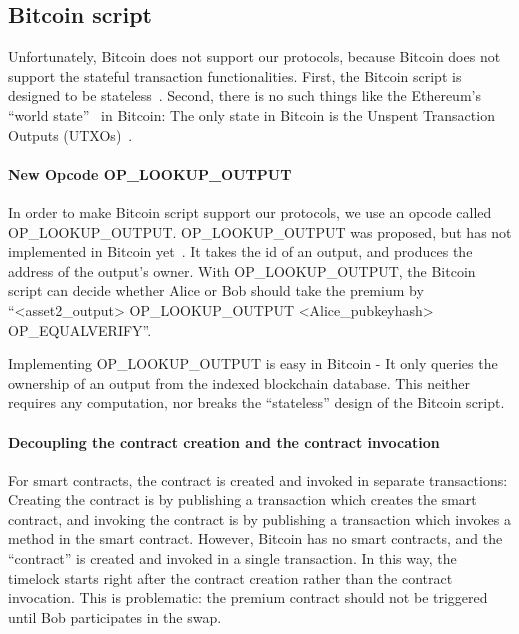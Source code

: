\subsection{Bitcoin script}

Unfortunately, Bitcoin does not support our protocols, because Bitcoin does not support the stateful transaction functionalities.
First, the Bitcoin script is designed to be stateless~\cite{okupski2014bitcoin}.
Second, there is no such things like the Ethereum's ``world state''~\cite{wood2014ethereum} in Bitcoin:
The only state in Bitcoin is the Unspent Transaction Outputs (UTXOs)~\cite{nakamoto2008bitcoin}.


\paragraph{New Opcode OP\_LOOKUP\_OUTPUT}
In order to make Bitcoin script support our protocols, we use an opcode called OP\_LOOKUP\_OUTPUT.
OP\_LOOKUP\_OUTPUT was proposed, but has not implemented in Bitcoin yet~\cite{op-lookup-output-origin}.
It takes the id of an output, and produces the address of the output's owner.
With OP\_LOOKUP\_OUTPUT, the Bitcoin script can decide whether Alice or Bob should take the premium by
``<asset2\_output> OP\_LOOKUP\_OUTPUT <Alice\_pubkeyhash> OP\_EQUALVERIFY''.

Implementing OP\_LOOKUP\_OUTPUT is easy in Bitcoin - It only queries the ownership of an output from the indexed blockchain database.
This neither requires any computation, nor breaks the ``stateless'' design of the Bitcoin script.


\paragraph{Decoupling the contract creation and the contract invocation}
For smart contracts, the contract is created and invoked in separate transactions:
Creating the contract is by publishing a transaction which creates the smart contract,
and invoking the contract is by publishing a transaction which invokes a method in the smart contract.
However, Bitcoin has no smart contracts, and the ``contract'' is created and invoked in a single transaction.
In this way, the timelock starts right after the contract creation rather than the contract invocation.
This is problematic: the premium contract should not be triggered until Bob participates in the swap.


